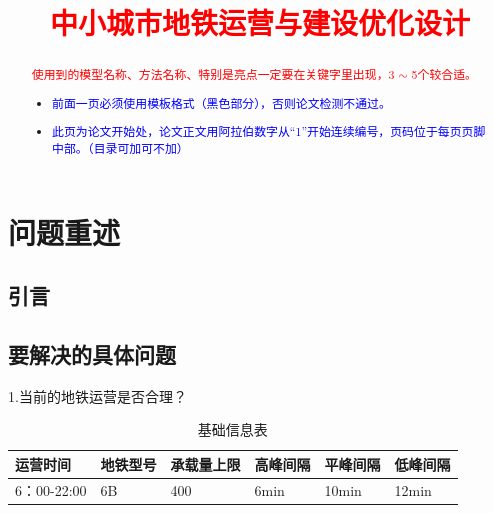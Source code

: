 \documentclass[12pt,a4paper]{mcmthesis}
\title{\textcolor{red}{中小城市地铁运营与建设优化设计}}
\date{}
\begin{document}
    \begin{abstract}
        

        \begin{keywords}
        {\song\xiaosihao
        \textcolor{red}{使用到的模型名称、方法名称、特别是亮点一定要在关键字里出现，3 $\sim$ 5个较合适。}}
        \end{keywords}

        \begin{itemize}
            \item \textcolor{blue}{前面一页必须使用模板格式（黑色部分），否则论文检测不通过。}
            \item \textcolor{blue}{此页为论文开始处，论文正文用阿拉伯数字从“1”开始连续编号，页码位于每页页脚中部。（目录可加可不加）}
        \end{itemize}

    \end{abstract}
    \maketitle
    \renewcommand{\contentsname}{\centerline{\sanhao\bfseries\HEI 目\quad 录}}
    \tableofcontents

    \newpage
    \setcounter{page}{1}


    \section{问题重述}

    \subsection{引言}
    

    \subsection{要解决的具体问题}

    1.当前的地铁运营是否合理？

    \begin{table}
        \centering
        \begin{tabular}{|l|l|l|l|l|l|}
            \hline
            运营时间       & 地铁型号 & 承载量上限 & 高峰间隔 & 平峰间隔  & 低峰间隔  \\ \hline
            6：00-22:00 & 6B   & 400   & 6min & 10min & 12min \\ \hline
        \end{tabular}
        \caption{基础信息表}
        \label{tab:基础信息表}
    \end{table}
\end{document}
